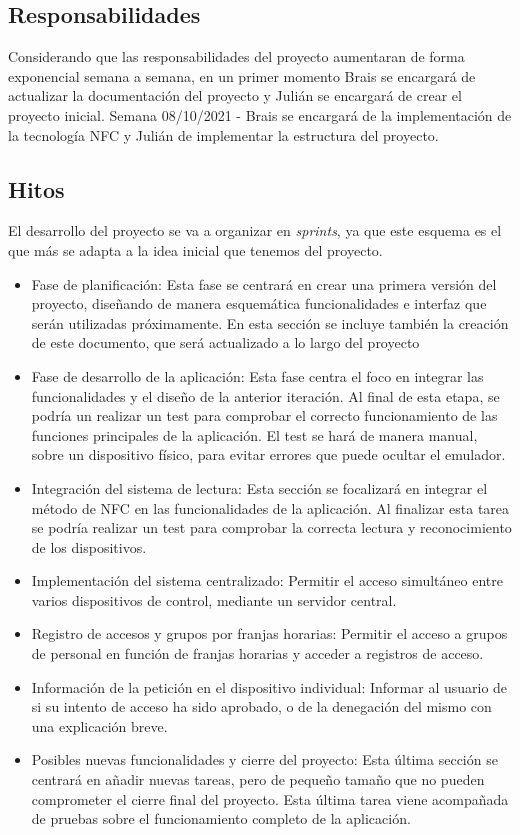 \documentclass[a4paper,openright,12pt]{article}
\begin{document}
\subsection{Responsabilidades}
Considerando que las responsabilidades del proyecto aumentaran de forma exponencial semana a semana, en un primer momento Brais se encargará de actualizar la documentación del proyecto y Julián se encargará de crear el proyecto inicial.
Semana 08/10/2021 - Brais se encargará de la implementación de la tecnología NFC y Julián de implementar la estructura del proyecto.

\subsection{Hitos}
El desarrollo del proyecto se va a organizar en \textit{sprints}, ya que este esquema es el que más se adapta a la idea inicial que tenemos del proyecto.

\begin{itemize}
\item{Fase de planificación: Esta fase se centrará en crear una primera versión del proyecto, diseñando de manera esquemática funcionalidades e interfaz que serán utilizadas próximamente. En esta sección se incluye también la creación de este documento, que será actualizado a lo largo del proyecto}
\item{Fase de desarrollo de la aplicación: Esta fase centra el foco en integrar las funcionalidades y el diseño de la anterior iteración. Al final de esta etapa, se podría un realizar un test para comprobar el correcto funcionamiento de las funciones principales de la aplicación. El test se hará de manera manual, sobre un dispositivo físico, para evitar errores que puede ocultar el emulador.}
\item{Integración del sistema de lectura: Esta sección se focalizará en integrar el método de NFC en las funcionalidades de la aplicación. Al finalizar esta tarea se podría realizar un test para comprobar la correcta lectura y reconocimiento de los dispositivos.}
\item{Implementación del sistema centralizado: Permitir el acceso simultáneo entre varios dispositivos de control, mediante un servidor central.}
\item{Registro de accesos y grupos por franjas horarias: Permitir el acceso a grupos de personal en función de franjas horarias y acceder a registros de acceso.}
\item{Información de la petición en el dispositivo individual: Informar al usuario de si su intento de acceso ha sido aprobado, o de la denegación del mismo con una explicación breve.}
\item{Posibles nuevas funcionalidades y cierre del proyecto: Esta última sección se centrará en añadir nuevas tareas, pero de pequeño tamaño que no pueden comprometer el cierre final del proyecto. Esta última tarea viene acompañada de pruebas sobre el funcionamiento completo de la aplicación.}
\end{itemize}
\end{document}
